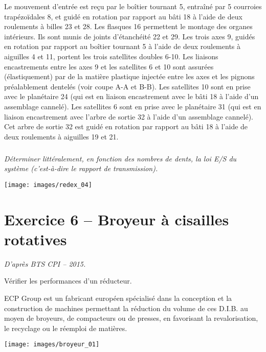 \documentclass[10pt,fleqn]{article} %
\begin{document}
\begin{multicols}{2}
Le mouvement d’entrée est reçu par le boîtier tournant 5, entraîné par 5 courroies trapézoïdales 8, et guidé en rotation par rapport au bâti 18 à l’aide de deux roulements à billes 23 et 28. 
Les flasques 16 permettent le montage des organes intérieurs. Ils sont munis de joints d’étanchéité 22 et 29. 
Les trois axes 9, guidés en rotation par rapport au boîtier tournant 5 à l’aide de deux roulements à aiguilles 4 et 11, portent les trois satellites doubles 6-10.
Les liaisons encastrements entre les axes 9 et les satellites 6 et 10 sont assurées (élastiquement) par de la matière plastique injectée entre les axes et les pignons préalablement dentelés (voir coupe A-A et B-B). 
Les satellites 10 sont en prise avec le planétaire 24 (qui est en liaison encastrement avec le bâti 18 à l’aide d’un assemblage cannelé).
Les satellites 6 sont en prise avec le planétaire 31 (qui est en liaison encastrement avec l’arbre de sortie 32 à l’aide d’un assemblage cannelé). Cet arbre de sortie 32 est guidé en rotation par rapport au bâti 18 à l’aide de deux roulements à aiguilles 19 et 21.



\subparagraph{}
\textit{Déterminer littéralement, en fonction des nombres de dents, la loi E/S du système (c'est-à-dire le rapport de transmission).}


%
%
%

\begin{center}
\texttt{[image: images/redex\_04]}
\end{center}




\section*{Exercice 6 -- {Broyeur à cisailles rotatives}}
\setcounter{exo}{0}
\textit{D'après BTS CPI -- 2015.}

\begin{obj}
Vérifier les performances d'un réducteur.
\end{obj}
ECP Group est un fabricant européen spécialisé
dans la conception et la construction de machines
permettant la réduction du volume de ces D.I.B. au
moyen de broyeurs, de compacteurs ou de presses,
en favorisant la revalorisation, le recyclage ou le réemploi
de matières.

\begin{center}
\texttt{[image: images/broyeur\_01]}
\end{center}


\end{multicols}
\end{document}
